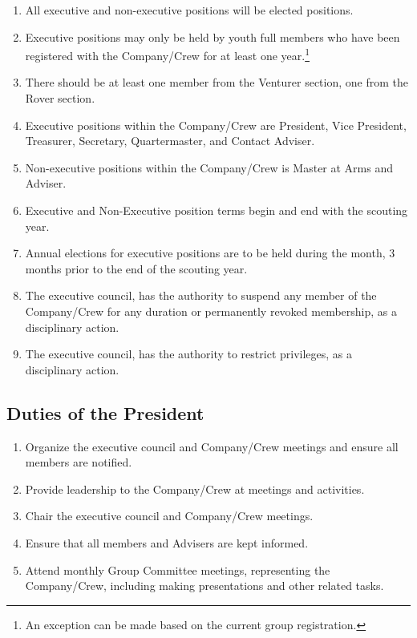 \begin{enumerate}
    \item All executive and non-executive positions will be elected positions.
    \item Executive positions may only be held by youth full members who have been registered with the Company/Crew for at least one year.\footnote{An exception can be made based on the current group registration.}
    \item There should be at least one member from the Venturer section, one from the Rover section. \footnotemark[\value{footnote}]
    \item Executive positions within the Company/Crew are President, Vice President, Treasurer, Secretary, Quartermaster, and Contact Adviser.
    \item Non-executive positions within the Company/Crew is Master at Arms and Adviser.
    \item Executive and Non-Executive position terms begin and end with the scouting year.
    \item Annual elections for executive positions are to be held during the month, 3 months prior to the end of the scouting year.
    \item The executive council, has the authority to suspend any member of the Company/Crew for any duration or permanently revoked membership, as a disciplinary action.
    \item The executive council, has the authority to restrict privileges, as a disciplinary action.
\end{enumerate}

\subsection{Duties of the President}
\begin{enumerate}
    \item Organize the executive council and Company/Crew meetings and ensure all members are notified.
    \item Provide leadership to the Company/Crew at meetings and activities.
    \item Chair the executive council and Company/Crew meetings.
    \item Ensure that all members and Advisers are kept informed.
    \item Attend monthly Group Committee meetings, representing the Company/Crew, including making presentations and other related tasks.
\end{enumerate}

